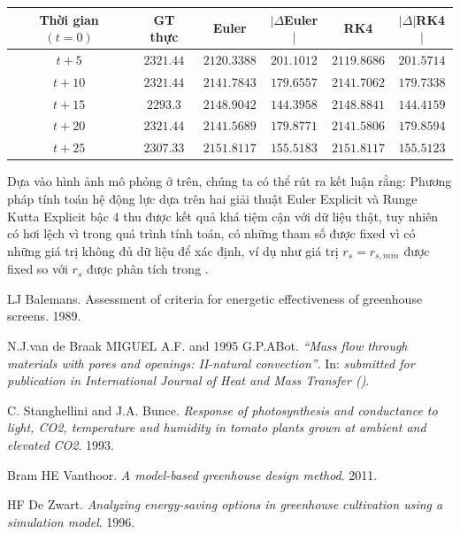 \documentclass[13pt,a4paper]{article}
\begin{document}
				\begin{center}
					\begin{tabular}{|c|c|c|c|c|c|}
						\hline
						Thời gian $(t=0)$ & GT thực & Euler & $|\Delta$Euler$|$ & RK4 & $|\Delta|$RK4$|$ \\
						\hline
						$t + 5$ & $2321.44$ & $2120.3388$ & $201.1012$ & $2119.8686$ & $201.5714$ \\
						\hline
						$t + 10$ & $2321.44$ & $2141.7843$ & $179.6557$ & $2141.7062$ & $179.7338$ \\
						\hline
						$t + 15$ & $2293.3$ & $2148.9042$ & $144.3958$ & $2148.8841$  & $144.4159$ \\
						\hline
						$t + 20$ & $2321.44$ & $2141.5689$ & $179.8771$ & $2141.5806$ & $179.8594$ \\
						\hline
						$t + 25$ & $2307.33$ & $2151.8117$ & $155.5183$ & $2151.8117$ & $155.5123$ \\
						\hline
					\end{tabular}
				\end{center}
				Dựa vào hình ảnh mô phỏng ở trên, chúng ta có thể rút ra kết luận rằng: Phương pháp tính toán hệ động lực dựa trên hai giải thuật Euler Explicit và Runge Kutta Explicit bậc 4 thu được kết quả khá tiệm cận với dữ liệu thật, tuy nhiên có hơi lệch vì trong quá trình tính toán, có những tham số được fixed vì có những giá trị không đủ dữ liệu để xác định, ví dụ như giá trị $r_s = r_{s,min}$ được fixed so với $r_s$ được phân tích trong \cite{Van11}. \\
	\newpage
	\begin{thebibliography}{80}
			LJ Balemans. Assessment of criteria for energetic effectiveness of greenhouse screens. 1989.
		
		 N.J.van de Braak MIGUEL A.F. and 1995 G.P.ABot. \textit{``Mass flow through materials with pores and openings: II-natural convection''}. In: \textit{submitted for publication in International Journal of Heat and Mass Transfer ()}.
			
		 C. Stanghellini and J.A. Bunce. \textit{Response of photosynthesis and conductance to light, CO2, temperature and humidity in tomato plants grown at ambient and elevated CO2}. 1993.
		
		Bram HE Vanthoor. \textit{A model-based greenhouse design method}. 2011.
		
		HF De Zwart. \textit{Analyzing energy-saving options in greenhouse cultivation using a simulation model}. 1996.

		\printbibliography
	\end{thebibliography}
\end{document}
